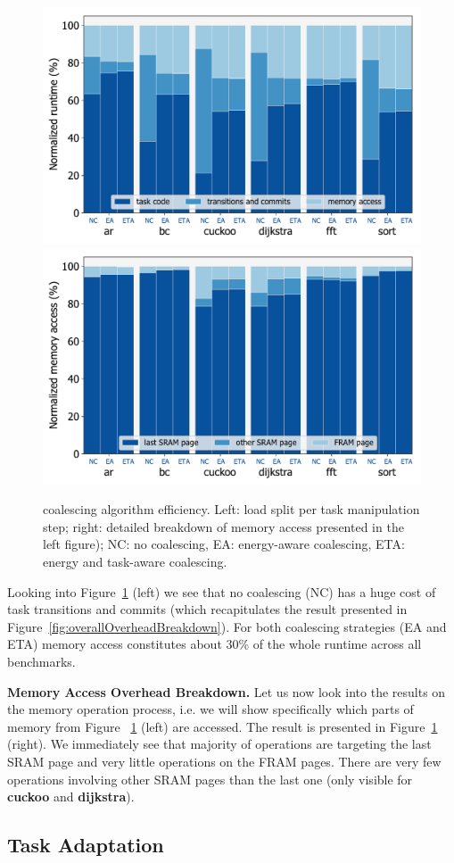 \begin{figure}
	\centering
	\includegraphics[width=0.49\columnwidth]{figures/overallOverhead}
	\includegraphics[width=0.49\columnwidth]{figures/memAccess}
	\caption{\sys coalescing algorithm efficiency. Left: load split per task manipulation step; right: detailed breakdown of memory access presented in the left figure); NC: no coalescing, EA: energy-aware coalescing, ETA: energy and task-aware coalescing.}
	\label{fig:coalEfficiency}
\end{figure}

Looking into Figure~\ref{fig:coalEfficiency} (left) we see that no coalescing (NC) \sys has a huge cost of task transitions and commits (which recapitulates the result presented in Figure~\ref{fig:overallOverheadBreakdown}). For both coalescing strategies (EA and ETA) memory access constitutes about 30\% of the whole \sys runtime across all benchmarks.

\textbf{\sys Memory Access Overhead Breakdown.} Let us now look into the results on the \sys memory operation process, i.e. we will show specifically which parts of memory from Figure~
\ref{fig:coalEfficiency} (left) are accessed. The result is presented in Figure~\ref{fig:coalEfficiency} (right). We immediately see that majority of operations are targeting the last SRAM page and very little operations on the FRAM pages. There are very few operations involving other SRAM pages than the last one (only visible for \textbf{cuckoo} and \textbf{dijkstra}). 

\subsection{\sys Task Adaptation}
\label{sec:result_coalescing}

